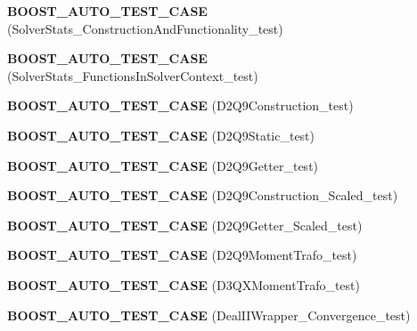 \begin{DoxyCompactItemize}
\item 
\hypertarget{namespacenatrium_a0d3613c7722c49a3f20b5cb8d9c6190c}{
{\bfseries BOOST\_\-AUTO\_\-TEST\_\-CASE} (SolverStats\_\-ConstructionAndFunctionality\_\-test)}
\label{namespacenatrium_a0d3613c7722c49a3f20b5cb8d9c6190c}

\item 
\hypertarget{namespacenatrium_ab8797e90a62a5280f7877bb3e2a5535f}{
{\bfseries BOOST\_\-AUTO\_\-TEST\_\-CASE} (SolverStats\_\-FunctionsInSolverContext\_\-test)}
\label{namespacenatrium_ab8797e90a62a5280f7877bb3e2a5535f}

\item 
\hypertarget{namespacenatrium_aaa6f7bc5b2e61e0c673c46d7d58b486b}{
{\bfseries BOOST\_\-AUTO\_\-TEST\_\-CASE} (D2Q9Construction\_\-test)}
\label{namespacenatrium_aaa6f7bc5b2e61e0c673c46d7d58b486b}

\item 
\hypertarget{namespacenatrium_a9e6ccf665a38e49780d3eb74ecb7ae2e}{
{\bfseries BOOST\_\-AUTO\_\-TEST\_\-CASE} (D2Q9Static\_\-test)}
\label{namespacenatrium_a9e6ccf665a38e49780d3eb74ecb7ae2e}

\item 
\hypertarget{namespacenatrium_a39bd87b48b869970d1ff9c39e8906611}{
{\bfseries BOOST\_\-AUTO\_\-TEST\_\-CASE} (D2Q9Getter\_\-test)}
\label{namespacenatrium_a39bd87b48b869970d1ff9c39e8906611}

\item 
\hypertarget{namespacenatrium_ad989d789b8bf82e68e1322b744f6c278}{
{\bfseries BOOST\_\-AUTO\_\-TEST\_\-CASE} (D2Q9Construction\_\-Scaled\_\-test)}
\label{namespacenatrium_ad989d789b8bf82e68e1322b744f6c278}

\item 
\hypertarget{namespacenatrium_a7988f30467753a9ffd505f19442f2356}{
{\bfseries BOOST\_\-AUTO\_\-TEST\_\-CASE} (D2Q9Getter\_\-Scaled\_\-test)}
\label{namespacenatrium_a7988f30467753a9ffd505f19442f2356}

\item 
\hypertarget{namespacenatrium_a99065e1e640a5c6ed259446a521e21c7}{
{\bfseries BOOST\_\-AUTO\_\-TEST\_\-CASE} (D2Q9MomentTrafo\_\-test)}
\label{namespacenatrium_a99065e1e640a5c6ed259446a521e21c7}

\item 
\hypertarget{namespacenatrium_aff7666ed1e4b6996f51dd95d5b6628f4}{
{\bfseries BOOST\_\-AUTO\_\-TEST\_\-CASE} (D3QXMomentTrafo\_\-test)}
\label{namespacenatrium_aff7666ed1e4b6996f51dd95d5b6628f4}

\item 
\hypertarget{namespacenatrium_a27e93123eac460080124636220f3b81b}{
{\bfseries BOOST\_\-AUTO\_\-TEST\_\-CASE} (DealIIWrapper\_\-Convergence\_\-test)}
\label{namespacenatrium_a27e93123eac460080124636220f3b81b}


\end{DoxyCompactItemize}
